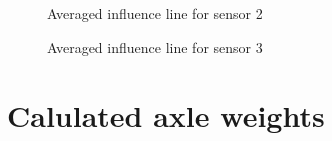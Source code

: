 \begin{figure}[H]
	\begin{adjustbox}{center}
		
	\end{adjustbox}
	\caption{Averaged influence line for sensor 2}
	\label{fig:infl_avg_sensor2_standard}
\end{figure}


\begin{figure}[H]
	\begin{adjustbox}{center}
		
	\end{adjustbox}
	\caption{Averaged influence line for sensor 3}
	\label{fig:infl_avg_sensor3_standard}
\end{figure}

\newpage
\chapter{Calulated axle weights}

